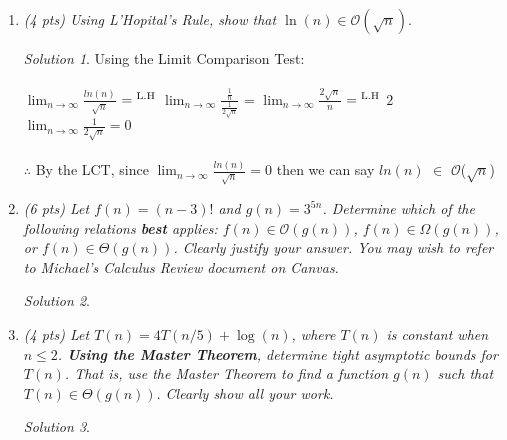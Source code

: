 \documentclass[12pt]{article}
\theoremstyle{remark}
\newtheorem*{solution}{Solution}
\newcommand{\makenonemptybox}[2]{%
\item[]
\fbox{%
\parbox[c][#1][t]{\dimexpr\linewidth-2\fboxsep-2\fboxrule}{
  \hrule width \hsize height 0pt
  #2
 }%
}%
\par\vspace{\ht\strutbox}
}
\begin{document}
\hrulefill

\begin{enumerate}


\pagebreak
\item {\itshape (4 pts) Using L'Hopital's Rule, show that $\ln(n) \in \mathcal{O}(\sqrt{n}).$}
\begin{solution}
Using the Limit Comparison Test: \\ \\ $\lim_{n\to\infty} \frac{ln(n)}{\sqrt{n}}$ $=\textsuperscript{L.H}$ $\lim_{n\to\infty} \frac{\frac{1}{n}}{\frac{1}{2\sqrt{n}}}$ = $\lim_{n\to\infty} \frac{2\sqrt{n}}{n}$ $=\textsuperscript{L.H}$ $2$ $\lim_{n\to\infty} \frac{1}{2\sqrt{n}} = 0$ \\ \\ $\therefore$ By the LCT, since $\lim_{n\to\infty} \frac{ln(n)}{\sqrt{n}} = 0$ then we can say $ln(n)$ $\in$ $\mathcal{O}$($\sqrt{n}$)
\end{solution}

\pagebreak
\item {\itshape (6 pts) Let $f(n) = (n-3)!$ and $g(n) = 3^{5n}$. Determine which of the following relations \textbf{best} applies: $f(n) \in \mathcal{O}(g(n))$, $f(n) \in \Omega(g(n))$, or $f(n) \in \Theta(g(n))$. Clearly justify your answer. You may wish to refer to Michael's Calculus Review document on Canvas.}
\begin{solution}
\end{solution}


\pagebreak


\pagebreak
\item {\itshape (4 pts) Let $T(n) = 4T(n/5) + \log(n)$, where $T(n)$ is constant when $n \leq 2$. \textbf{Using the Master Theorem}, determine tight asymptotic bounds for $T(n)$. That is, use the Master Theorem to find a function $g(n)$ such that $T(n) \in \Theta(g(n)).$ Clearly show all your work.}
\begin{solution}
\end{solution}



\end{enumerate}
\end{document}
